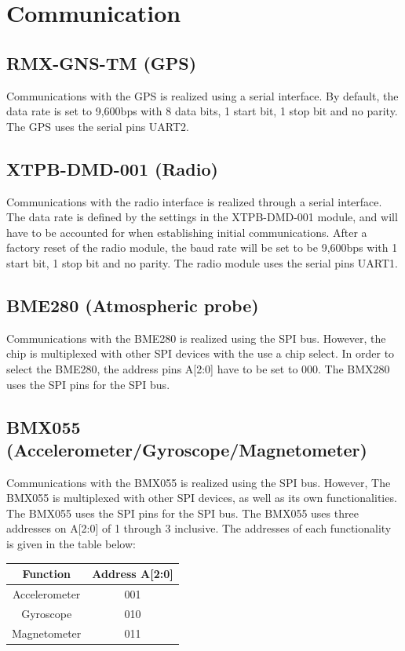 \documentclass[12pt,article]{memoir}
\begin{document}
\newpage

\chapter{Communication}
\label{chap:Communication}

\section{RMX-GNS-TM (GPS)}
Communications with the GPS is realized using a serial interface. By default, the data rate is set to 9,600bps with 8 data bits, 1 start bit, 1 stop bit and no parity. The GPS uses the serial pins UART2.

\section{XTPB-DMD-001 (Radio)}
Communications with the radio interface is realized through a serial interface. The data rate is defined by the settings in the XTPB-DMD-001 module, and will have to be accounted for when establishing initial communications. After a factory reset of the radio module, the baud rate will be set to be 9,600bps with 1 start bit, 1 stop bit and no parity. The radio module uses the serial pins UART1.

\section{BME280 (Atmospheric probe)}
Communications with the BME280 is realized using the SPI bus. However, the chip is multiplexed with other SPI devices with the use a chip select. In order to select the BME280, the address pins A[2:0] have to be set to 000. The BMX280 uses the SPI pins for the SPI bus.

\section{BMX055 (Accelerometer/Gyroscope/Magnetometer)}
Communications with the BMX055 is realized using the SPI bus. However, The BMX055 is multiplexed with other SPI devices, as well as its own functionalities. The BMX055 uses the SPI pins for the SPI bus. The BMX055 uses three addresses on A[2:0] of 1 through 3 inclusive. The addresses of each functionality is given in the table below:\\
\begin{table}[h]
\centering
\begin{tabular}{|c|c|}
	\hline
	Function & Address A[2:0]\\ \hline
	Accelerometer & 001\\ \hline
	Gyroscope & 010\\ \hline
	Magnetometer & 011\\ \hline
\end{tabular}
\end{table}
\end{document}
